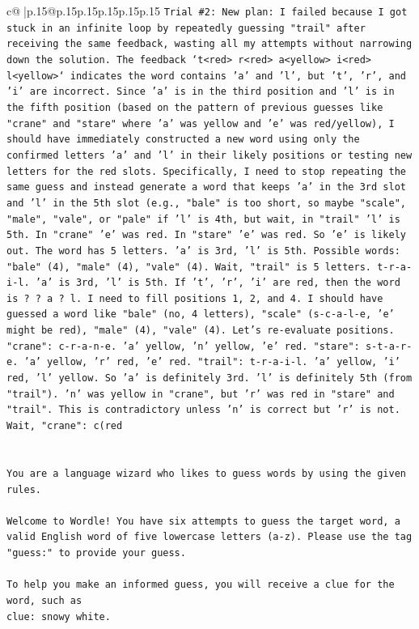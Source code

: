 \documentclass{article}
\begin{document}
{\begin{supertabular}{c@{$\;$}|p{.15\linewidth}@{}p{.15\linewidth}p{.15\linewidth}p{.15\linewidth}p{.15\linewidth}p{.15\linewidth}}
{{{\texttt{Trial \#2: New plan: I failed because I got stuck in an infinite loop by repeatedly guessing "trail" after receiving the same feedback, wasting all my attempts without narrowing down the solution. The feedback `t<red> r<red> a<yellow> i<red> l<yellow>` indicates the word contains 'a' and 'l', but 't', 'r', and 'i' are incorrect. Since 'a' is in the third position and 'l' is in the fifth position (based on the pattern of previous guesses like "crane" and "stare" where 'a' was yellow and 'e' was red/yellow), I should have immediately constructed a new word using only the confirmed letters 'a' and 'l' in their likely positions or testing new letters for the red slots. Specifically, I need to stop repeating the same guess and instead generate a word that keeps 'a' in the 3rd slot and 'l' in the 5th slot (e.g., "bale" is too short, so maybe "scale", "male", "vale", or "pale" if 'l' is 4th, but wait, in "trail" 'l' is 5th. In "crane" 'e' was red. In "stare" 'e' was red. So 'e' is likely out. The word has 5 letters. 'a' is 3rd, 'l' is 5th. Possible words: "bale" (4), "male" (4), "vale" (4). Wait, "trail" is 5 letters. t{-}r{-}a{-}i{-}l. 'a' is 3rd, 'l' is 5th. If 't', 'r', 'i' are red, then the word is ? ? a ? l. I need to fill positions 1, 2, and 4. I should have guessed a word like "bale" (no, 4 letters), "scale" (s{-}c{-}a{-}l{-}e, 'e' might be red), "male" (4), "vale" (4). Let's re{-}evaluate positions. "crane": c{-}r{-}a{-}n{-}e. 'a' yellow, 'n' yellow, 'e' red. "stare": s{-}t{-}a{-}r{-}e. 'a' yellow, 'r' red, 'e' red. "trail": t{-}r{-}a{-}i{-}l. 'a' yellow, 'i' red, 'l' yellow. So 'a' is definitely 3rd. 'l' is definitely 5th (from "trail"). 'n' was yellow in "crane", but 'r' was red in "stare" and "trail". This is contradictory unless 'n' is correct but 'r' is not. Wait, "crane": c(red} \\
\\ 
\\ 
\texttt{You are a language wizard who likes to guess words by using the given rules.} \\
\\ 
\texttt{Welcome to Wordle! You have six attempts to guess the target word, a valid English word of five lowercase letters (a{-}z). Please use the tag "guess:" to provide your guess.} \\
\\ 
\texttt{To help you make an informed guess, you will receive a clue for the word, such as} \\
\texttt{clue: snowy white.} \\
}}}
\end{supertabular}}
\end{document}
